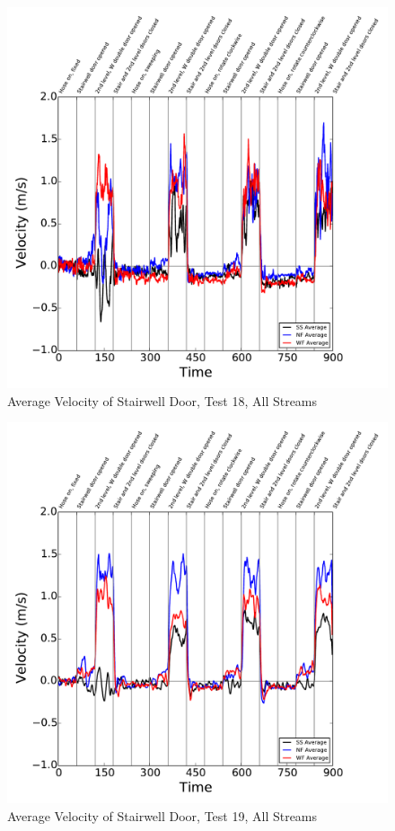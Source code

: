 \documentclass[12pt,oneside]{book}
\begin{document}
\begin{figure}[!ht]
\includegraphics[width=6in]{../../Figures/Hose_Test_Figures/Test_18_West_063014_BDP_A10_Avg}
\caption{Average Velocity of Stairwell Door, Test 18, All Streams}
\label{fig:Test_18_BDP_A10_Avg_All}
\end{figure}

\begin{figure}[!ht]
\includegraphics[width=6in]{../../Figures/Hose_Test_Figures/Test_19_West_063014_BDP_A10_Avg}
\caption{Average Velocity of Stairwell Door, Test 19, All Streams}
\label{fig:Test_19_BDP_A10_Avg_All}
\end{figure}
\end{document}
